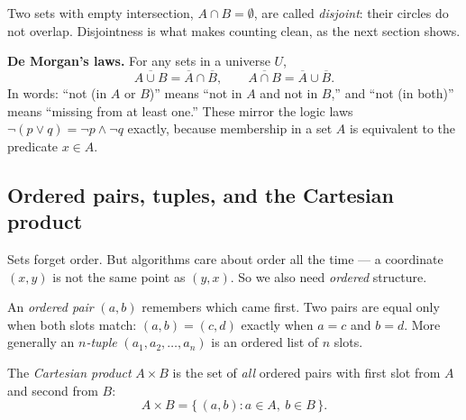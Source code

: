 Two sets with empty intersection, $A \cap B = \emptyset$, are called
\emph{disjoint}: their circles do not overlap. Disjointness is what makes counting
clean, as the next section shows.

\begin{formalbox}
\textbf{De Morgan's laws.} For any sets in a universe $U$,
\[
\overline{A \cup B} = \overline{A} \cap \overline{B},
\qquad
\overline{A \cap B} = \overline{A} \cup \overline{B}.
\]
In words: ``not (in $A$ or $B$)'' means ``not in $A$ and not in $B$,'' and ``not (in
both)'' means ``missing from at least one.'' These mirror the logic laws
$\lnot(p \lor q) = \lnot p \land \lnot q$ exactly, because membership in a set $A$
is equivalent to the predicate $x \in A$.
\end{formalbox}

\subsection{Ordered pairs, tuples, and the Cartesian product}

Sets forget order. But algorithms care about order all the time --- a coordinate
$(x, y)$ is not the same point as $(y, x)$. So we also need \emph{ordered} structure.

An \emph{ordered pair} $(a, b)$ remembers which came first. Two pairs are equal only
when both slots match: $(a,b) = (c,d)$ exactly when $a = c$ and $b = d$. More
generally an \emph{$n$-tuple} $(a_1, a_2, \dots, a_n)$ is an ordered list of $n$
slots.

The \emph{Cartesian product} $A \times B$ is the set of \emph{all} ordered pairs with
first slot from $A$ and second from $B$:
\[
A \times B = \{\, (a, b) : a \in A,\ b \in B \,\}.
\]


